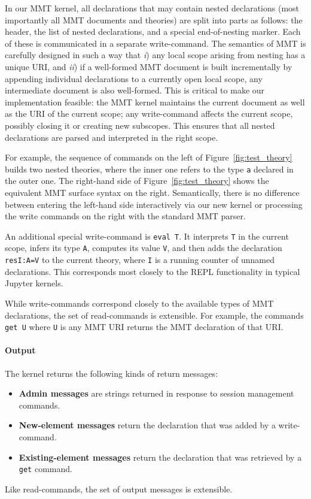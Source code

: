 In our MMT kernel, all declarations that may contain nested declarations (most importantly all MMT documents and theories) are split into parts as follows: the header, the list of nested declarations, and a special end-of-nesting marker.
Each of these is communicated in a separate write-command.
The semantics of MMT is carefully designed in such a way that \emph{i}) any local scope arising from nesting has a unique URI, and \emph{ii}) if a well-formed MMT document is built incrementally by appending individual declarations to a currently open local scope, any intermediate document is also well-formed.
This is critical to make our implementation feasible: the MMT kernel maintains the current document as well as the URI of the current scope; any write-command affects the current scope, possibly closing it or creating new subscopes.
This ensures that all nested declarations are parsed and interpreted in the right scope.

For example, the sequence of commands on the left of Figure~\ref{fig:test_theory} builds two nested theories, where the inner one refers to the type \texttt{a} declared in the outer one.
The right-hand side of Figure~\ref{fig:test_theory} shows the equivalent MMT surface syntax on the right.
Semantically, there is no difference between entering the left-hand side interactively via our new kernel or processing the write commands on the right with the standard MMT parser.

An additional special write-command is \texttt{eval T}.
It interprets \texttt{T} in the current scope, infers its type \texttt{A}, computes its value \texttt{V}, and then adds the declaration \texttt{resI:A=V} to the current theory, where \texttt{I} is a running counter of unnamed declarations.
This corresponds most closely to the REPL functionality in typical Jupyter kernels.

While write-commands correspond closely to the available types of MMT declarations, the set of read-commands is extensible.
For example, the commands \texttt{get U} where \texttt{U} is any MMT URI returns the MMT declaration of that URI.

\paragraph{Output}
The kernel returns the following kinds of return messages:
\begin{itemize}
\item \textbf{Admin messages} are strings returned in response to session management commands.
\item \textbf{New-element messages} return the declaration that was added by a write-command.
\item \textbf{Existing-element messages} return the declaration that was retrieved by a \texttt{get} command.
\end{itemize}
Like read-commands, the set of output messages is extensible.

